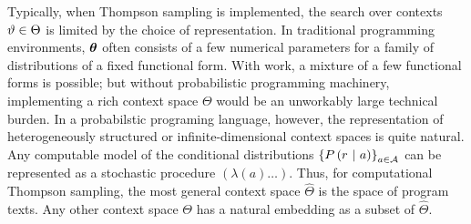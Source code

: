 Typically, when Thompson sampling is implemented, the search over contexts
$\vartheta \in \Theta$ is limited by the choice of representation.  In
traditional programming environments, $\bm{\theta}$ often consists of a few
numerical parameters for a family of distributions of a fixed functional
form.  With work, a mixture of a few functional forms is possible; but
without probabilistic programming machinery, implementing a rich context
space $\Theta$ would be an unworkably large technical burden.  In a
probabilstic programing language, however, the representation of
heterogeneously structured or infinite-dimensional context spaces is quite
natural.  Any computable model of the conditional distributions
$\left\{ P\left( r \ \middle\vert\  a \right) \right\}_{a \in \mathcal{A}}$ can be represented as a stochastic
procedure $(\lambda (a) \ldots)$.  Thus, for computational Thompson sampling,
the most general context space $\widehat\Theta$ is the space of program texts.
Any other context space $\Theta$ has a natural embedding as a subset of
$\widehat\Theta$.
